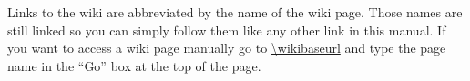 Links to the wiki are abbreviated by the name of the wiki page. Those names
are still linked so you can simply follow them like any other link in this
manual. If you want to access a wiki page manually go to \url{\wikibaseurl}
and type the page name in the ``Go'' box at the top of the page.


